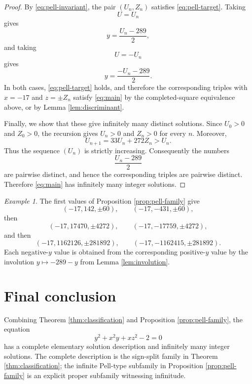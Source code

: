 \documentclass[11pt]{article}
\theoremstyle{remark}
\newtheorem{example}[theorem]{Example}
\begin{document}
\begin{proof}
By \eqref{eq:pell-invariant}, the pair $(U_n,Z_n)$ satisfies \eqref{eq:pell-target}.  Taking
\[
        U=U_n
\]
gives
\[
        y=\frac{U_n-289}{2},
\]
and taking
\[
        U=-U_n
\]
gives
\[
        y=\frac{-U_n-289}{2}.
\]
In both cases, \eqref{eq:pell-target} holds, and therefore the corresponding triples with $x=-17$ and $z=\pm Z_n$ satisfy \eqref{eq:main} by the completed-square equivalence above, or by Lemma \ref{lem:discriminant}.

Finally, we show that these give infinitely many distinct solutions.  Since $U_0>0$ and $Z_0>0$, the recursion gives $U_n>0$ and $Z_n>0$ for every $n$.  Moreover,
\[
        U_{n+1}=33U_n+272Z_n>U_n.
\]
Thus the sequence $(U_n)$ is strictly increasing.  Consequently the numbers
\[
        \frac{U_n-289}{2}
\]
are pairwise distinct, and hence the corresponding triples are pairwise distinct.  Therefore \eqref{eq:main} has infinitely many integer solutions.
\end{proof}

\begin{example}
The first values of Proposition \ref{prop:pell-family} give
\[
        (-17,142,\pm 60),
        \qquad
        (-17,-431,\pm 60),
\]
then
\[
        (-17,17470,\pm 4272),
        \qquad
        (-17,-17759,\pm 4272),
\]
and then
\[
        (-17,1162126,\pm 281892),
        \qquad
        (-17,-1162415,\pm 281892).
\]
Each negative-$y$ value is obtained from the corresponding positive-$y$ value by the involution $y\mapsto -289-y$ from Lemma \ref{lem:involution}.
\end{example}

\section{Final conclusion}

Combining Theorem \ref{thm:classification} and Proposition \ref{prop:pell-family}, the equation
\[
        y^2+x^2y+xz^2-2=0
\]
has a complete elementary solution description and infinitely many integer solutions.  The complete description is the sign-split family in Theorem \ref{thm:classification}; the infinite Pell-type subfamily in Proposition \ref{prop:pell-family} is an explicit proper subfamily witnessing infinitude.
\end{document}
